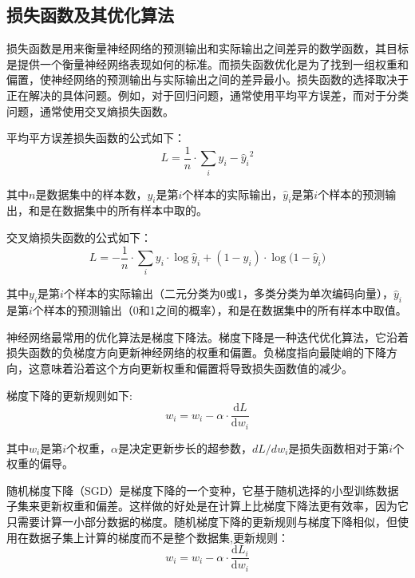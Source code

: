 \subsection{损失函数及其优化算法}

损失函数是用来衡量神经网络的预测输出和实际输出之间差异的数学函数，其目标是提供一个衡量神经网络表现如何的标准。而损失函数优化是为了找到一组权重和偏置，使神经网络的预测输出与实际输出之间的差异最小。损失函数的选择取决于正在解决的具体问题。例如，对于回归问题，通常使用平均平方误差，而对于分类问题，通常使用交叉熵损失函数。

平均平方误差损失函数的公式如下：
\begin{equation}
\label{eq:2_18}
L = \frac{1}{n} \cdot \sum _i{y_i - \hat y_{i}}^2
\end{equation}

其中$n$是数据集中的样本数，$y_i$是第$i$个样本的实际输出，$\hat y_{i}$是第$i$个样本的预测输出，和是在数据集中的所有样本中取的。

交叉熵损失函数的公式如下：
\begin{equation}
\label{eq:2_19}
L = - \frac{1}{n} \cdot \sum _i{y_i \cdot \log{\hat y_i} + (1 - y_i) \cdot \log{(1 -\hat y_i})}
\end{equation}

其中$y_i$是第$i$个样本的实际输出（二元分类为0或1，多类分类为单次编码向量），$\hat y_i$是第$i$个样本的预测输出（0和1之间的概率），和是在数据集中的所有样本中取值。

神经网络最常用的优化算法是梯度下降法。梯度下降是一种迭代优化算法，它沿着损失函数的负梯度方向更新神经网络的权重和偏置。负梯度指向最陡峭的下降方向，这意味着沿着这个方向更新权重和偏置将导致损失函数值的减少。

梯度下降的更新规则如下:
\begin{equation}
\label{eq:2_20}
w_i = w_i - \alpha \cdot \frac{\mathrm{d}{L}}{\mathrm{d}{w_i}}
\end{equation}


其中$w_i$是第$i$个权重，$\alpha$是决定更新步长的超参数，$dL/dw_i$是损失函数相对于第$i$个权重的偏导。


随机梯度下降（SGD）是梯度下降的一个变种，它基于随机选择的小型训练数据子集来更新权重和偏差。这样做的好处是在计算上比梯度下降法更有效率，因为它只需要计算一小部分数据的梯度。随机梯度下降的更新规则与梯度下降相似，但使用在数据子集上计算的梯度而不是整个数据集,更新规则：
\begin{equation}
\label{eq:2_21}
w_i = w_i - \alpha \cdot \frac{\mathrm{d}{L_i}}{\mathrm{d}{w_i}}
\end{equation}

